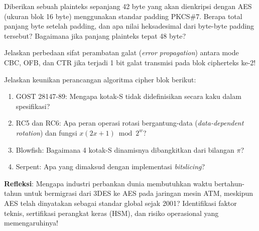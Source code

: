 \documentclass[main.tex]{subfiles}
\begin{document}
\begin{latihan}
  \item Diberikan sebuah plainteks sepanjang 42 byte yang akan dienkripsi dengan AES (ukuran blok 16 byte) menggunakan standar padding PKCS\#7. Berapa total panjang byte setelah padding, dan apa nilai heksadesimal dari byte-byte padding tersebut? Bagaimana jika panjang plainteks tepat 48 byte?

  \item Jelaskan perbedaan sifat perambatan galat (\textit{error propagation}) antara mode CBC, OFB, dan CTR jika terjadi 1 bit galat transmisi pada blok cipherteks ke-2!

  \item Jelaskan keunikan perancangan algoritma cipher blok berikut:
  \begin{enumerate}
    \item GOST 28147-89: Mengapa kotak-S tidak didefinisikan secara kaku dalam spesifikasi?
    \item RC5 dan RC6: Apa peran operasi rotasi bergantung-data (\textit{data-dependent rotation}) dan fungsi $x(2x+1) \bmod 2^w$?
    \item Blowfish: Bagaimana 4 kotak-S dinamisnya dibangkitkan dari bilangan $\pi$?
    \item Serpent: Apa yang dimaksud dengan implementasi \textit{bitslicing}?
  \end{enumerate}
  \item \textbf{Refleksi}: Mengapa industri perbankan dunia membutuhkan waktu bertahun-tahun untuk bermigrasi dari 3DES ke AES pada jaringan mesin ATM, meskipun AES telah dinyatakan sebagai standar global sejak 2001? Identifikasi faktor teknis, sertifikasi perangkat keras (HSM), dan risiko operasional yang memengaruhinya!
\end{latihan}

\end{document}
